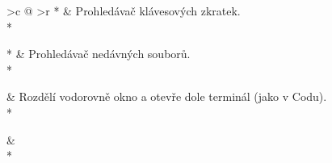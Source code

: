 \documentclass[12pt,twoside]{article}
\makeatletter
\def\setmenukeyswin{\def\tw@mk@os{win}}
\makeatother
\begin{document}
\begin{xltabular}{\textwidth}{
		>{\setmenukeyswin}c @{\hspace{2em}}
		>{\renewcommand\cellalign{cl}\RaggedRight\arraybackslash}r}
	* & Prohledávač klávesových zkratek.\\*
	\midrule

	* & Prohledávač nedávných souborů.\\*
	\midrule

	 & Rozdělí vodorovně okno a otevře dole terminál (jako v
	Codu).\\*
	\midrule

	 & \\*
	\bottomrule
\end{xltabular}
\end{document}
